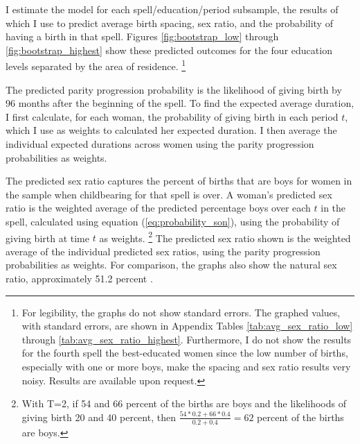 \documentclass[12pt,letterpaper]{article}
\begin{document}
I estimate the model for each spell/education/period subsample, the results of which I use 
to predict average birth spacing, sex ratio, and the probability of having a birth in that 
spell.
Figures \ref{fig:bootstrap_low} through \ref{fig:bootstrap_highest}
show these predicted outcomes for the four education levels separated by the area of 
residence.%
\footnote{
For legibility, the graphs do not show standard errors.
The graphed values, with standard errors, are shown in Appendix Tables 
\ref{tab:avg_sex_ratio_low} through \ref{tab:avg_sex_ratio_highest}.
Furthermore, I do not show the results for the fourth spell the best-educated women since 
the low number of births, especially with one or more boys, make the spacing and sex ratio 
results very noisy.
Results are available upon request.
}


The predicted parity progression probability is the likelihood of giving birth by 96 
months after the beginning of the spell.
To find the expected average duration, I first calculate, for each woman, the probability 
of giving birth in each period $t$, which I use as weights to calculated her expected 
duration. 
I then average the individual expected durations across women using the parity progression
probabilities as weights.

The predicted sex ratio captures the percent of births that are boys for women in 
the sample when childbearing for that spell is over.
A woman's predicted sex ratio is the weighted average of the predicted percentage boys 
over each $t$ in the spell, calculated using equation (\ref{eq:probability_son}), using
the probability of giving birth at time $t$ as weights.%
\footnote{
With T=2, if 54 and 66 percent of the births are boys and the likelihoods of 
giving birth 20 and 40 percent, then $\frac{54*0.2+66*0.4}{0.2+0.4} = 62$ percent of the
births are boys.
}
The predicted sex ratio shown is the weighted average of the individual predicted sex 
ratios, using the parity progression probabilities as weights.
For comparison, the graphs also show the natural sex ratio, approximately 51.2 percent 
\citep{ben-porath76b,jacobsen99,Portner2015b}.


\end{document}
